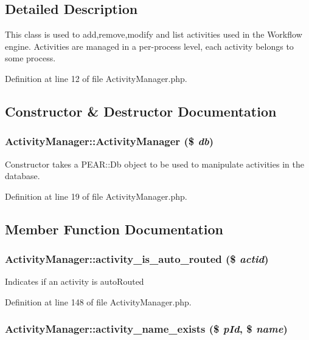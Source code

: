 \subsection{Detailed Description}
This class is used to add,remove,modify and list activities used in the Workflow engine. Activities are managed in a per-process level, each activity belongs to some process. 



Definition at line 12 of file Activity\-Manager.php.

\subsection{Constructor \& Destructor Documentation}
\subsubsection{\setlength{\rightskip}{0pt plus 5cm}Activity\-Manager::Activity\-Manager (\$ {\em db})}\label{classActivityManager_a0}


Constructor takes a PEAR::Db object to be used to manipulate activities in the database. 

Definition at line 19 of file Activity\-Manager.php.

\subsection{Member Function Documentation}
\subsubsection{\setlength{\rightskip}{0pt plus 5cm}Activity\-Manager::activity\_\-is\_\-auto\_\-routed (\$ {\em actid})}\label{classActivityManager_a10}


Indicates if an activity is auto\-Routed 

Definition at line 148 of file Activity\-Manager.php.
\subsubsection{\setlength{\rightskip}{0pt plus 5cm}Activity\-Manager::activity\_\-name\_\-exists (\$ {\em p\-Id}, \$ {\em name})}\label{classActivityManager_a15}


